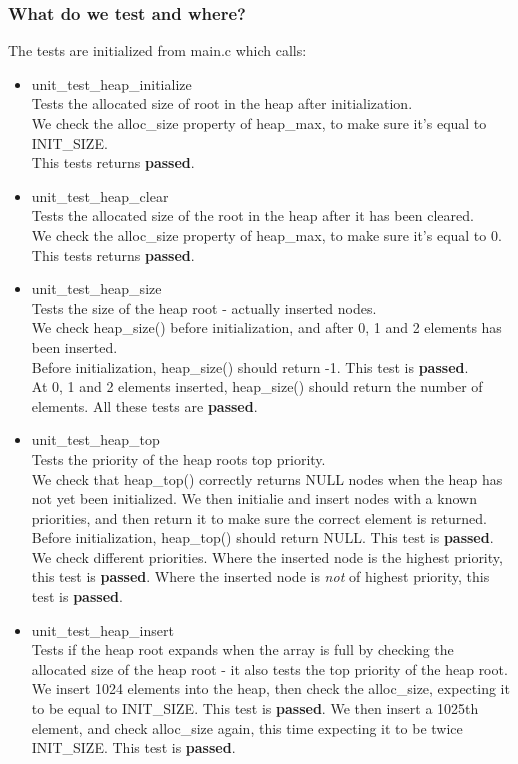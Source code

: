 \documentclass[a4paper,12pt,danish]{report}
\begin{document}
\subsubsection{What do we test and where?}
The tests are initialized from main.c which calls:
\\
\begin{itemize}
  \item{unit\_test\_heap\_initialize}
    \\
    Tests the allocated size of root in the heap after initialization.
    \\
    We check the alloc\_size property of heap\_max, to make sure it's equal to INIT\_SIZE.
    \\
    This tests returns \textbf{passed}.
  \item{unit\_test\_heap\_clear}
    \\
    Tests the allocated size of the root in the heap after it has been cleared.
    \\
    We check the alloc\_size property of heap\_max, to make sure it's equal to 0.
    \\
    This tests returns \textbf{passed}.
  \item{unit\_test\_heap\_size}
    \\
    Tests the size of the heap root - actually inserted nodes.
    \\
    We check heap\_size() before initialization, and after 0, 1 and 2 elements has been inserted.
    \\
    Before initialization, heap\_size() should return -1. This test is \textbf{passed}.
    \\
    At 0, 1 and 2 elements inserted, heap\_size() should return the number of elements. All these tests are \textbf{passed}.
  \item{unit\_test\_heap\_top}
    \\
    Tests the priority of the heap roots top priority.
    \\
    We check that heap\_top() correctly returns NULL nodes when the heap has not yet been initialized. We then initialie and insert nodes with a known priorities, and then return it to make sure the correct element is returned.
    \\
    Before initialization, heap\_top() should return NULL. This test is \textbf{passed}.
    \\
    We check different priorities. Where the inserted node is the highest priority, this test is \textbf{passed}. Where the inserted node is \textit{not} of highest priority, this test is \textbf{passed}.
  \item{unit\_test\_heap\_insert}
    \\
    Tests if the heap root expands when the array is full by checking the allocated size of the heap root - it also tests the top priority of the heap root.
    \\
    We insert 1024 elements into the heap, then check the alloc\_size, expecting it to be equal to INIT\_SIZE. This test is \textbf{passed}. We then insert a 1025th element, and check alloc\_size again, this time expecting it to be twice INIT\_SIZE. This test is \textbf{passed}.
    \\
    

\end{itemize}
\end{document}
